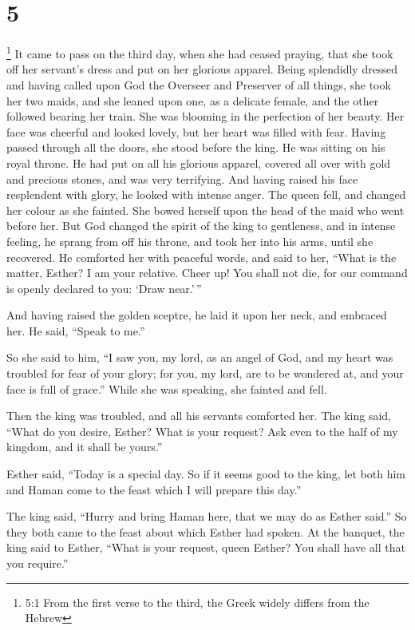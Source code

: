 \hypertarget{section-4}{%
\section{5}\label{section-4}}

 \footnote{5:1 From the first verse to the third, the Greek
  widely differs from the Hebrew} It came to pass on the third day, when
she had ceased praying, that she took off her servant's dress and put on
her glorious apparel. Being splendidly dressed and having called upon
God the Overseer and Preserver of all things, she took her two maids,
and she leaned upon one, as a delicate female, and the other followed
bearing her train. She was blooming in the perfection of her beauty. Her
face was cheerful and looked lovely, but her heart was filled with fear.
Having passed through all the doors, she stood before the king. He was
sitting on his royal throne. He had put on all his glorious apparel,
covered all over with gold and precious stones, and was very terrifying.
And having raised his face resplendent with glory, he looked with
intense anger. The queen fell, and changed her colour as she fainted.
She bowed herself upon the head of the maid who went before her. But God
changed the spirit of the king to gentleness, and in intense feeling, he
sprang from off his throne, and took her into his arms, until she
recovered. He comforted her with peaceful words, and said to her, ``What
is the matter, Esther? I am your relative. Cheer up! You shall not die,
for our command is openly declared to you: `Draw near.'\,''

 And having raised the golden sceptre, he laid it upon her
neck, and embraced her. He said, ``Speak to me.''

So she said to him, ``I saw you, my lord, as an angel of God, and my
heart was troubled for fear of your glory; for you, my lord, are to be
wondered at, and your face is full of grace.'' While she was speaking,
she fainted and fell.

Then the king was troubled, and all his servants comforted her.
 The king said, ``What do you desire, Esther? What is your
request? Ask even to the half of my kingdom, and it shall be yours.''

 Esther said, ``Today is a special day. So if it seems good
to the king, let both him and Haman come to the feast which I will
prepare this day.''

 The king said, ``Hurry and bring Haman here, that we may do
as Esther said.'' So they both came to the feast about which Esther had
spoken.  At the banquet, the king said to Esther, ``What is
your request, queen Esther? You shall have all that you require.''

